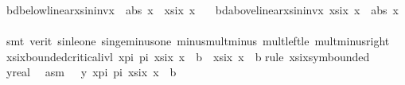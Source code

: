 \begin{isabellebody}
\endisatagproof
{\isafoldproof}%
%
\isadelimproof
\isanewline
%
\endisadelimproof
\isanewline
{}\isamarkupfalse%
\ bd{\isacharunderscore}{\kern0pt}below{\isacharunderscore}{\kern0pt}linear{\isacharunderscore}{\kern0pt}xsininvx{\isacharcolon}{\kern0pt}\ {\isachardoublequoteopen}{\isacharminus}{\kern0pt}\ abs\ x\ {\isasymle}\ xsix\ x{\isachardoublequoteclose}\isanewline
\ \ \ bd{\isacharunderscore}{\kern0pt}above{\isacharunderscore}{\kern0pt}linear{\isacharunderscore}{\kern0pt}xsininvx{\isacharcolon}{\kern0pt}\ {\isachardoublequoteopen}xsix\ x\ {\isasymle}\ abs\ x{\isachardoublequoteclose}\isanewline
%
\isadelimproof
\ \ %
\endisadelimproof
%
\isatagproof
{}\isamarkupfalse%
\ {\isacharparenleft}{\kern0pt}smt\ {\isacharparenleft}{\kern0pt}verit{\isacharparenright}{\kern0pt}\ sin{\isacharunderscore}{\kern0pt}le{\isacharunderscore}{\kern0pt}one\ sin{\isacharunderscore}{\kern0pt}ge{\isacharunderscore}{\kern0pt}minus{\isacharunderscore}{\kern0pt}one\ minus{\isacharunderscore}{\kern0pt}mult{\isacharunderscore}{\kern0pt}minus\ mult{\isacharunderscore}{\kern0pt}left{\isacharunderscore}{\kern0pt}le\ mult{\isacharunderscore}{\kern0pt}minus{\isacharunderscore}{\kern0pt}right{\isacharparenright}{\kern0pt}{\isacharplus}{\kern0pt}%
\endisatagproof
{\isafoldproof}%
%
\isadelimproof
\isanewline
%
\endisadelimproof
\isanewline
\isanewline
{}\isamarkupfalse%
\ xsix{\isacharunderscore}{\kern0pt}bounded{\isacharunderscore}{\kern0pt}critical{\isacharunderscore}{\kern0pt}ivl{\isacharcolon}{\kern0pt}\ {\isachardoublequoteopen}{\isasymforall}x{\isasymin}{\isacharbraceleft}{\kern0pt}{}{\isacharslash}{\kern0pt}{\isacharparenleft}{\kern0pt}{}{\isacharasterisk}{\kern0pt}pi{\isacharparenright}{\kern0pt}\ {\isacharless}{\kern0pt}{\isachardot}{\kern0pt}{\isachardot}{\kern0pt}{\isacharless}{\kern0pt}{}{\isacharslash}{\kern0pt}pi{\isacharbraceright}{\kern0pt}{\isachardot}{\kern0pt}\ xsix\ x\ {\isasymge}\ b\ {\isasymLongrightarrow}\ xsix\ x\ {\isasymge}\ b{\isachardoublequoteclose}\isanewline
%
\isadelimproof
%
\endisadelimproof
%
\isatagproof
{}\isamarkupfalse%
{\isacharparenleft}{\kern0pt}rule\ xsix{\isacharunderscore}{\kern0pt}sym{\isacharunderscore}{\kern0pt}bounded{\isacharparenright}{\kern0pt}\isanewline
\ \ \isamarkupfalse%
\ y{\isacharcolon}{\kern0pt}{\isacharcolon}{\kern0pt}real\ \isamarkupfalse%
\ asm{\isacharcolon}{\kern0pt}\ {\isachardoublequoteopen}{}\ {\isasymle}\ y{\isachardoublequoteclose}\ {\isachardoublequoteopen}{\isasymforall}x{\isasymin}{\isacharbraceleft}{\kern0pt}{}{\isacharslash}{\kern0pt}{\isacharparenleft}{\kern0pt}{}{\isacharasterisk}{\kern0pt}pi{\isacharparenright}{\kern0pt}\ {\isacharless}{\kern0pt}{\isachardot}{\kern0pt}{\isachardot}{\kern0pt}{\isacharless}{\kern0pt}{}{\isacharslash}{\kern0pt}pi{\isacharbraceright}{\kern0pt}{\isachardot}{\kern0pt}\ xsix\ x\ {\isasymge}\ b{\isachardoublequoteclose}\isanewline

\end{isabellebody}

